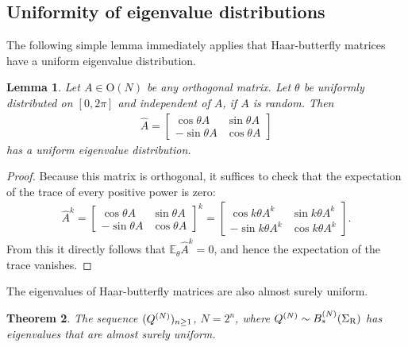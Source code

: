 \documentclass{amsart}
\newtheorem{theorem}{Theorem}[section]
\newtheorem{lemma}[theorem]{Lemma}
\theoremstyle{definition}
\theoremstyle{remark}
\numberwithin{equation}{section}
\begin{document}
\subsection{Uniformity of eigenvalue distributions}
The following simple lemma immediately applies that Haar-butterfly matrices have a uniform eigenvalue distribution.
\begin{lemma}
Let $A \in \mathrm O(N)$ be any orthogonal matrix.  Let $\theta$ be uniformly distributed on $[0,2\pi]$ and independent of $A$, if  $A$ is random.  Then
\begin{align}
\hat A = \begin{bmatrix} \cos \theta A & \sin \theta A \\ - \sin \theta A & \cos \theta A \end{bmatrix}
\end{align}
has a uniform eigenvalue distribution.
\end{lemma}
\begin{proof}
Because this matrix is orthogonal, it suffices to check that the expectation of the trace of every positive power is zero:
\begin{align}
\hat A^k = \begin{bmatrix} \cos \theta A & \sin \theta A \\ - \sin \theta A & \cos \theta A \end{bmatrix}^k = \begin{bmatrix} \cos k\theta A^k & \sin k\theta A^k \\ - \sin k\theta A^k & \cos k\theta A^k \end{bmatrix}.
\end{align}
From this it directly follows that $\mathbb E_\theta \hat A^k = 0$, and hence the expectation of the trace vanishes.
\end{proof}
The eigenvalues of Haar-butterfly matrices are also almost surely uniform.
\begin{theorem}  
The sequence $(Q^{(N)})_{n \geq 1}$, $N = 2^n$, where $Q^{(N)} \sim B_s^{(N)}(\Sigma_{\mathrm{R}})$ has eigenvalues that are almost surely uniform.
\end{theorem}
\end{document}
